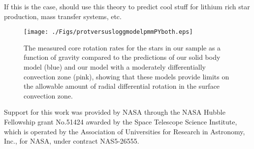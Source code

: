 \documentclass[linenumbers,twocolumn]{aastex62}
\begin{document}
    If this is the case, should use this theory to predict cool stuff for lithium rich star production, mass transfer systems, etc. 





\begin{figure}[!htb]
\begin{center}
\texttt{[image: ./Figs/protversusloggmodelpmmPYboth.eps]}%
\caption{The measured core rotation rates for the stars in our sample as a function of gravity compared to the predictions of our solid body model (blue) and our model with a moderately differentially convection zone (pink), showing that these models provide limits on the allowable amount of radial differential rotation in the surface convection zone.}
\label{Fig:bothmodels}
\end{center}
\end{figure}


\begin{acknowledgements}

 Support for this work was provided by NASA through the NASA Hubble Fellowship grant No.51424 awarded by the Space Telescope Science Institute, which is operated by the Association of Universities for Research in Astronomy, Inc., for NASA, under contract NAS5-26555.


\end{acknowledgements}






\end{document}
